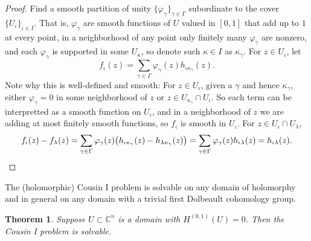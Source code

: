 \documentclass[12pt,openany]{book}
\newcommand{\C}{{\mathbb{C}}}
\theoremstyle{plain}
\newtheorem{thm}{Theorem}[section]
\theoremstyle{remark}
\theoremstyle{definition}
\theoremstyle{exercise}
\theoremstyle{example}
\begin{document}
\begin{proof}
Find a smooth partition of unity $\{ \varphi_\gamma \}_{\gamma \in \Gamma}$
subordinate to
the cover $\{ U_{\iota} \}_{\iota \in I}$.  That is, $\varphi_\gamma$ are
smooth functions of $U$ valued in $[0,1]$ that add up to $1$ at every point,
in a neighborhood of any point only finitely many $\varphi_\gamma$ are
nonzero, and each $\varphi_{\gamma}$ is supported in some $U_\kappa$,
so denote such $\kappa \in I$ as $\kappa_\gamma$.
For $z \in U_\iota$, let
\begin{equation*}
f_\iota(z) = \sum_{\gamma \in \Gamma} \varphi_\gamma(z) h_{\iota \kappa_\gamma}(z) .
\end{equation*}
Note why this is well-defined and smooth:
For $z \in U_\iota$, given a $\gamma$ and hence $\kappa_\gamma$,
either $\varphi_\gamma=0$ in some neighborhood of $z$
or $z \in U_{\kappa_\gamma} \cap U_\iota$.
So each term can be interpretted as a smooth function on
$U_\iota$, and in a neighborhood of $z$ we are adding at most finitely
smooth functions, so $f_\iota$ is smooth in $U_\iota$.
For $z \in U_\iota \cap U_\lambda$,
\begin{equation*}
f_\iota(z)-f_\lambda(z) =
\sum_{\gamma \in \Gamma} \varphi_\gamma(z)
\bigl( h_{\iota \kappa_\gamma}(z) - h_{\lambda \kappa_\gamma}(z) \bigr)
=
\sum_{\gamma \in \Gamma} \varphi_\gamma(z)
h_{\iota\lambda}(z)
=
h_{\iota\lambda}(z) .
\qedhere
\end{equation*}
\end{proof}

The (holomorphic) Cousin I problem
is solvable on any domain of holomorphy and in general
on any domain with a trivial first Dolbeault cohomology group.

\begin{thm}
Suppose $U \subset \C^n$ is a domain with $H^{(0,1)}(U)=0$.
Then the Cousin I problem is solvable.
\end{thm}
\end{document}
